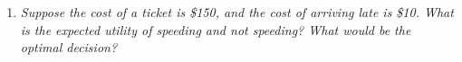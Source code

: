 \documentclass{article}
\begin{document}
\begin{enumerate}[(a)]
\begin{enumerate}

  \item \textit{Suppose the cost of a ticket is \$150, and the cost of arriving 
    late is \$10. What is the expected utility of speeding and not speeding?
    What would be the optimal decision?}




  \end{enumerate}
\end{enumerate}
\end{document}
